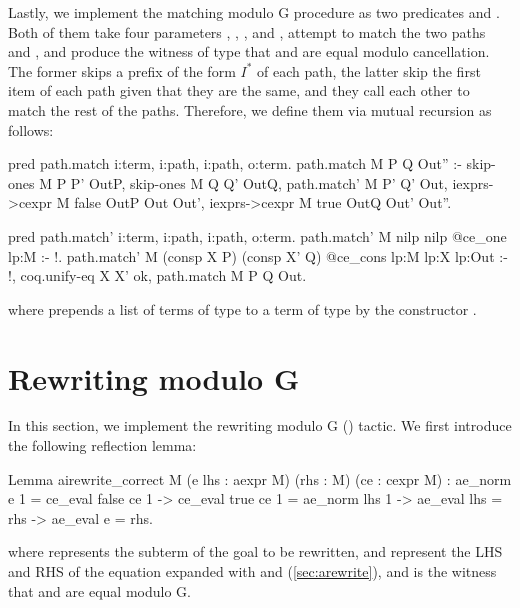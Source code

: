 \documentclass[a4paper,UKenglish,cleveref,autoref]{lipics-v2021}
\begin{document}
Lastly, we implement the matching modulo G procedure as two predicates  and
. Both of them take four parameters , , , and ,
attempt to match the two paths  and , and produce the witness  of type
 that  and  are equal modulo cancellation.
The former skips a prefix of the form $I^*$ of each path, the latter skip the first item of each
path given that they are the same, and they call each other to match the rest of the paths.
Therefore, we define them via mutual recursion as follows:
\begin{elpicode}
pred path.match i:term, i:path, i:path, o:term.
path.match M P Q Out'' :-
  skip-ones M P P' OutP,
  skip-ones M Q Q' OutQ,
  path.match' M P' Q' Out,
  iexprs->cexpr M {{ false }} OutP Out Out',
  iexprs->cexpr M {{ true }} OutQ Out' Out''.

pred path.match' i:term, i:path, i:path, o:term.
path.match' M nilp nilp {{ @ce_one lp:M }} :- !.
path.match' M (consp X P) (consp X' Q) {{ @ce_cons lp:M lp:X lp:Out }} :- !,
  coq.unify-eq X X' ok, path.match M P Q Out.
\end{elpicode}
where  prepends a list  of terms of type 
to a term  of type  by the constructor .

\section{Rewriting modulo G}
\label{sec:airewrite}

In this section, we implement the rewriting modulo G () tactic.
We first introduce the following reflection lemma:
\begin{rocqcode}
Lemma airewrite_correct {M} (e lhs : aexpr M) (rhs : M) (ce : cexpr M) :
  ae_norm e 1 = ce_eval false ce 1 -> ce_eval true ce 1 = ae_norm lhs 1 ->
  ae_eval lhs = rhs -> ae_eval e = rhs.
\end{rocqcode}
where  represents the subterm of the goal to be rewritten,  and 
represent the LHS and RHS of the equation expanded with  and 
(\cref{sec:arewrite}), and  is the witness that  and  are equal modulo G.
\end{document}
